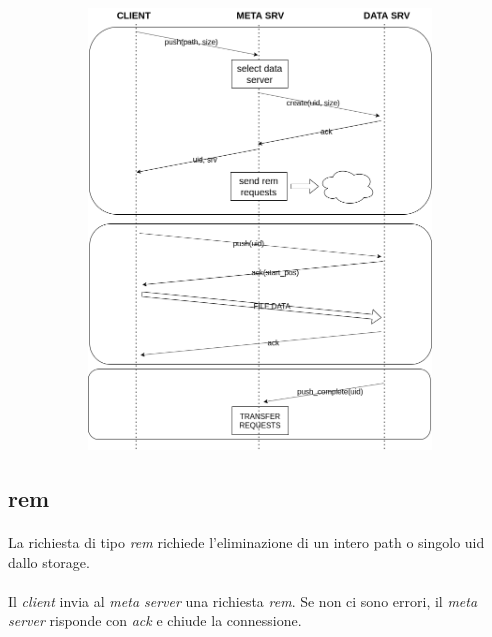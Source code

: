 \documentclass[11pt,a4paper,english]{article}
\begin{document}
\begin{figure}[H]
	\centering
	\begin{subfigure}{0.80\linewidth}
		\includegraphics[width=\linewidth]{../diagrams/requests/push_request.png}
	\end{subfigure}
\end{figure}


\subsection{rem}

\paragraph{} La richiesta di tipo \emph{rem} richiede l'eliminazione di un intero path o singolo uid dallo storage.

\paragraph{} Il \emph{client} invia al \emph{meta server} una richiesta \emph{rem}. Se non ci sono errori, il \emph{meta server} risponde con \emph{ack} e chiude la connessione.
\end{document}
